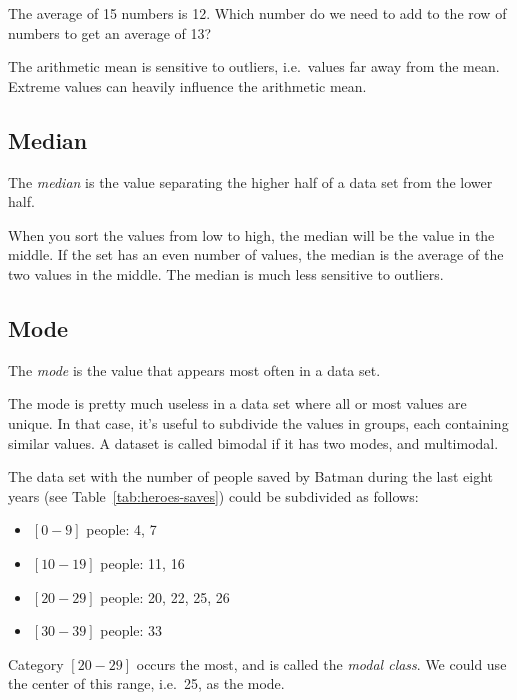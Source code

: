 \begin{exercise}
  The average of 15 numbers is 12. Which number do we need to add to the row of numbers to get an average of 13?
\end{exercise}

The arithmetic mean is sensitive to outliers, i.e.~values far away from the mean. Extreme values can heavily influence the arithmetic mean.

\subsection{Median}
\label{ssec:median}

\begin{definition}[Median]
  The \emph{median} is the value separating the higher half of a data set from the lower half.
\end{definition}

When you sort the values from low to high, the median will be the value in the middle. If the set has an even number of values, the median is the average of the two values in the middle. The median is much less sensitive to outliers.

\subsection{Mode}
\label{ssec:mode}

\begin{definition}[Mode]
  The \emph{mode} is the value that appears most often in a data set.
\end{definition}

The mode is pretty much useless in a data set where all or most values are unique. In that case, it's useful to subdivide the values in groups, each containing similar values. A dataset is called bimodal if it has two modes, and multimodal.

\begin{example}
  The data set with the number of people saved by Batman during the last eight years (see Table~\ref{tab:heroes-saves}) could be subdivided as follows:
  
  \begin{itemize}
    \item $[0-9]$ people: 4, 7
    \item $[10-19]$ people: 11, 16
    \item $[20-29]$ people: 20, 22, 25, 26
    \item $[30-39]$ people: 33
  \end{itemize}
  
  Category $[20-29]$ occurs the most, and is called the \emph{modal class}. We could use the center of this range, i.e.~25, as the mode.
\end{example}

